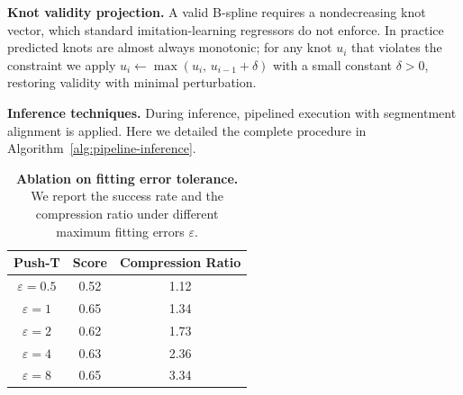 
\noindent\textbf{Knot validity projection.}
A valid B-spline requires a nondecreasing knot vector, which standard imitation-learning regressors do not enforce. In practice predicted knots are almost always monotonic; for any knot $u_i$ that violates the constraint we apply $u_i \leftarrow \max(u_i,\, u_{i-1} + \delta)$ with a small constant $\delta > 0$, restoring validity with minimal perturbation.

\noindent\textbf{Inference techniques.} During inference, pipelined execution with segmentment alignment is applied. Here we detailed the complete procedure in Algorithm~\ref{alg:pipeline-inference}.

\begin{table}[h]
\centering
\setlength{\tabcolsep}{10.0pt}
\begin{tabular}{c|cc}
\toprule
Push-T & Score & Compression Ratio \\
\midrule
$\varepsilon{=}0.5$ & 0.52 & 1.12 \\
$\varepsilon{=}1$   & 0.65 & 1.34 \\
$\varepsilon{=}2$   & 0.62 & 1.73 \\
$\varepsilon{=}4$   & 0.63 & 2.36 \\
$\varepsilon{=}8$   & 0.65 & 3.34 \\
\bottomrule
\end{tabular}
\caption{\textbf{Ablation on fitting error tolerance.}
We report the success rate and the compression ratio under different maximum fitting errors $\varepsilon$.}
\label{tab:pushT_fit_error}
\end{table}



